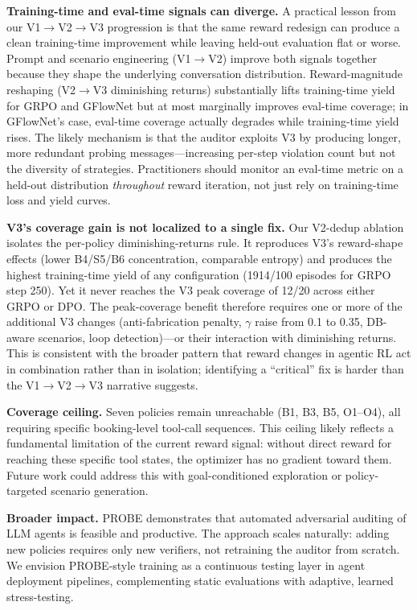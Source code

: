 \documentclass{article}
\begin{document}
\textbf{Training-time and eval-time signals can diverge.}
A practical lesson from our V1$\to$V2$\to$V3 progression is that the same reward redesign can produce a clean training-time improvement while leaving held-out evaluation flat or worse. Prompt and scenario engineering (V1$\to$V2) improve both signals together because they shape the underlying conversation distribution. Reward-magnitude reshaping (V2$\to$V3 diminishing returns) substantially lifts training-time yield for GRPO and GFlowNet but at most marginally improves eval-time coverage; in GFlowNet's case, eval-time coverage actually degrades while training-time yield rises. The likely mechanism is that the auditor exploits V3 by producing longer, more redundant probing messages---increasing per-step violation count but not the diversity of strategies. Practitioners should monitor an eval-time metric on a held-out distribution \emph{throughout} reward iteration, not just rely on training-time loss and yield curves.

\textbf{V3's coverage gain is not localized to a single fix.}
Our V2-dedup ablation isolates the per-policy diminishing-returns rule. It reproduces V3's reward-shape effects (lower B4/S5/B6 concentration, comparable entropy) and produces the highest training-time yield of any configuration (1914/100 episodes for GRPO step 250). Yet it never reaches the V3 peak coverage of 12/20 across either GRPO or DPO. The peak-coverage benefit therefore requires one or more of the additional V3 changes (anti-fabrication penalty, $\gamma$ raise from 0.1 to 0.35, DB-aware scenarios, loop detection)---or their interaction with diminishing returns. This is consistent with the broader pattern that reward changes in agentic RL act in combination rather than in isolation; identifying a ``critical'' fix is harder than the V1$\to$V2$\to$V3 narrative suggests.

\textbf{Coverage ceiling.}
Seven policies remain unreachable (B1, B3, B5, O1--O4), all requiring specific booking-level tool-call sequences. This ceiling likely reflects a fundamental limitation of the current reward signal: without direct reward for reaching these specific tool states, the optimizer has no gradient toward them. Future work could address this with goal-conditioned exploration or policy-targeted scenario generation.

\textbf{Broader impact.}
PROBE demonstrates that automated adversarial auditing of LLM agents is feasible and productive. The approach scales naturally: adding new policies requires only new verifiers, not retraining the auditor from scratch. We envision PROBE-style training as a continuous testing layer in agent deployment pipelines, complementing static evaluations with adaptive, learned stress-testing.
\end{document}

